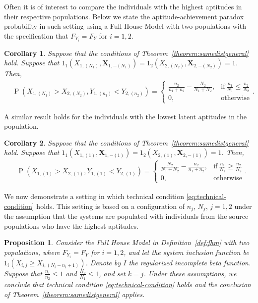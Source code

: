 \documentclass[12pt]{article}
\DeclareMathOperator*{\Prob}{P}
\newtheorem{corollary}{Corollary}[theorem]
\newtheorem{prop}[theorem]{Proposition}
\begin{document}
Often it is of interest to compare the individuals with the highest aptitudes in their respective populations. Below we state the aptitude-achievement paradox probability in such setting using a Full House Model with two populations with the specification that $F_{Y_i} = F_Y$ for $i=1,2$.

\begin{corollary} \label{corollary:samedisttop}
Suppose that the conditions of Theorem~\ref{theorem:samedistgeneral} hold. Suppose that $1_1(X_{1,(N_1)}, \textbf{X}_{1,-(N_1)}) = 1_2(X_{2,(N_2)}, \textbf{X}_{2,-(N_2)}) = 1$. Then,
\begin{align*}
	&\Prob\left(X_{1,(N_1)} > X_{2,(N_2)}, Y_{1,(n_1)} < Y_{2,(n_2)}\right) 
  = \begin{cases}
      \frac{n_2}{n_1 + n_2} - \frac{N_2}{N_1 + N_2}, & \text{if}\ \frac{n_1}{N_1} \leq \frac{n_2}{N_2} \\
      0, & \text{otherwise}
    \end{cases}.
\end{align*}
\end{corollary}

A similar result holds for the individuals with the lowest latent aptitudes in the population.

\begin{corollary} \label{corollary:samedistbottom}
Suppose that the conditions of Theorem~\ref{theorem:samedistgeneral} hold. Suppose that $1_1(X_{1,(1)}, \textbf{X}_{1,-(1)}) = 1_2(X_{2,(1)}, \textbf{X}_{2,-(1)}) = 1$. Then,
\begin{align*}
	&\Prob\left(X_{1,(1)} > X_{2,(1)}, Y_{1,(1)} < Y_{2,(1)}\right) 
  = \begin{cases}
      \frac{N_2}{N_1 + N_2} - \frac{n_2}{n_1 + n_2}, & \text{if}\ \frac{n_1}{N_1} \geq \frac{n_2}{N_2} \\
      0, & \text{otherwise}
    \end{cases}.
\end{align*}
\end{corollary}

We now demonstrate a setting in which technical condition \eqref{eq:technical-condition} holds. This setting is based on a configuration of $n_j$, $N_j$, $j=1,2$ under the assumption that the systems are populated with individuals from the source populations who have the highest aptitudes.

\begin{prop} \label{prop:condition}
Consider the Full House Model in Definition~\ref{def:fhm} with two populations, where $F_{Y_i} = F_{Y}$ for $i=1,2$, and let the system inclusion function be $1_i(X_{i,j} \geq X_{i,(N_i - n_i + 1)})$. Denote by $I$ the regularized incomplete beta function. Suppose that $\frac{n_1}{n_2}\leq 1$ and $\frac{N_2}{N_1} \leq 1$, and set $k = j$. Under these assumptions, we conclude that technical condition \eqref{eq:technical-condition} holds and the conclusion of Theorem~\ref{theorem:samedistgeneral} applies.	
\end{prop}
\end{document}
